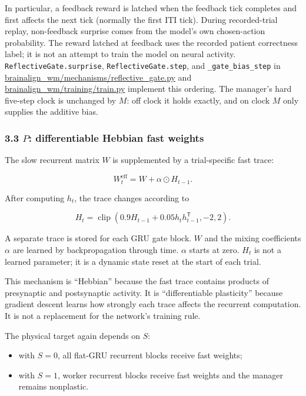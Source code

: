 \documentclass[
  10pt,
]{article}
\providecommand{\tightlist}{%
  \setlength{\itemsep}{0pt}\setlength{\parskip}{0pt}}
\begin{document}
In particular, a feedback reward is latched when the feedback tick
completes and first affects the next tick (normally the first ITI tick).
During recorded-trial replay, non-feedback surprise comes from the
model's own chosen-action probability. The reward latched at feedback
uses the recorded patient correctness label; it is not an attempt to
train the model on neural activity. \texttt{ReflectiveGate.surprise},
\texttt{ReflectiveGate.step}, and \texttt{\_gate\_bias\_step} in
\url{brainalign_wm/mechanisms/reflective_gate.py} and
\url{brainalign_wm/training/train.py} implement this ordering. The
manager's hard five-step clock is unchanged by \(M\): off clock it holds
exactly, and on clock \(M\) only supplies the additive bias.

\hypertarget{p-differentiable-hebbian-fast-weights}{%
\subsubsection{\texorpdfstring{3.3 \(P\): differentiable Hebbian fast
weights}{3.3 P: differentiable Hebbian fast weights}}\label{p-differentiable-hebbian-fast-weights}}

The slow recurrent matrix \(W\) is supplemented by a trial-specific fast
trace:

\[
W_t^{\mathrm{eff}}=W+\alpha\odot H_{t-1}.
\]

After computing \(h_t\), the trace changes according to

\[
H_t=
\operatorname{clip}
\left(
0.9H_{t-1}+0.05h_th_{t-1}^{\mathsf T},
-2,2
\right).
\]

A separate trace is stored for each GRU gate block. \(W\) and the mixing
coefficients \(\alpha\) are learned by backpropagation through time.
\(\alpha\) starts at zero. \(H_t\) is not a learned parameter; it is a
dynamic state reset at the start of each trial.

This mechanism is ``Hebbian'' because the fast trace contains products
of presynaptic and postsynaptic activity. It is ``differentiable
plasticity'' because gradient descent learns how strongly each trace
affects the recurrent computation. It is not a replacement for the
network's training rule.

The physical target again depends on \(S\):

\begin{itemize}
\tightlist
\item
  with \(S=0\), all flat-GRU recurrent blocks receive fast weights;
\item
  with \(S=1\), worker recurrent blocks receive fast weights and the
  manager remains nonplastic.
\end{itemize}
\end{document}
